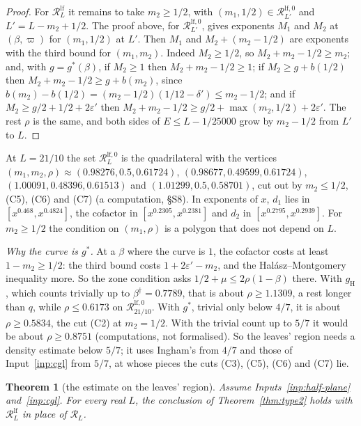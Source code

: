 \documentclass[11pt]{article}
\newtheorem{theorem}{Theorem}[section]
\theoremstyle{definition}
\begin{document}
\begin{proof}
For $\mathcal R^{\mathrm{lf}}_L$ it remains to take $m_2 \ge 1/2$, with $(m_1, 1/2) \in \mathcal
R^{\mathrm{lf},0}_{L'}$ and $L' = L - m_2 + 1/2$. The proof above, for $\mathcal R^{\mathrm{lf},0}_{L'}$, gives
exponents $M_1$ and $M_2$ at $(\beta, \varpi)$ for $(m_1, 1/2)$ at $L'$. Then $M_1$ and $M_2 + (m_2 - 1/2)$ are
exponents with the third bound for $(m_1, m_2)$. Indeed $M_2 \ge 1/2$, so $M_2 + m_2 - 1/2 \ge m_2$; and, with $g =
g^*(\beta)$, if $M_2 \ge 1$ then $M_2 + m_2 - 1/2 \ge 1$; if $M_2 \ge g + b(1/2)$ then $M_2 + m_2 - 1/2 \ge g +
b(m_2)$, since $b(m_2) - b(1/2) = (m_2 - 1/2)(1/12 - \delta') \le m_2 - 1/2$; and if $M_2 \ge g/2 + 1/2 +
2\varepsilon'$ then $M_2 + m_2 - 1/2 \ge g/2 + \max(m_2, 1/2) + 2\varepsilon'$. The rest $\rho$ is the same, and both
sides of $E \le L - 1/25000$ grow by $m_2 - 1/2$ from $L'$ to $L$.
\end{proof}

At $L = 21/10$ the set $\mathcal R^{\mathrm{lf},0}_L$ is the quadrilateral with the vertices $(m_1, m_2, \rho) \approx
(0.98276, 0.5, 0.61724)$, $(0.98677, 0.49599, 0.61724)$, $(1.00091, 0.48396, 0.61513)$ and $(1.01299, 0.5, 0.58701)$,
cut out by $m_2 \le 1/2$, (C5), (C6) and (C7) (a computation, \S S8). In exponents of $x$, $d_1$ lies in $[x^{0.468},
x^{0.4824}]$, the cofactor in $[x^{0.2305}, x^{0.2381}]$ and $d_2$ in $[x^{0.2795}, x^{0.2939}]$. For $m_2 \ge 1/2$ the
condition on $(m_1, \rho)$ is a polygon that does not depend on $L$.

\emph{Why the curve is $g^*$.} At a $\beta$ where the curve is $1$, the cofactor costs at least $1 - m_2 \ge 1/2$: the
third bound costs $1 + 2\varepsilon' - m_2$, and the Hal\'asz--Montgomery inequality more. So the zone condition asks
$1/2 + \mu \le 2\rho(1 - \beta)$ there. With $g_{\mathrm H}$, which counts trivially up to $\beta^\dagger = 0.7789$,
that is about $\rho \ge 1.1309$, a rest longer than $q$, while $\rho \le 0.6173$ on $\mathcal
R^{\mathrm{lf},0}_{21/10}$. With $g^*$, trivial only below $4/7$, it is about $\rho \ge 0.5834$, the cut (C2) at $m_2 =
1/2$. With the trivial count up to $5/7$ it would be about $\rho \ge 0.8751$ (computations, not formalised). So the
leaves' region needs a density estimate below $5/7$; it uses Ingham's from $4/7$ and those of
Input~\ref{inp:cgl} from $5/7$, at whose pieces the cuts (C3), (C5), (C6) and (C7) lie.

\begin{theorem}[the estimate on the leaves' region]\label{thm:type2-leaves}
Assume Inputs~\ref{inp:half-plane} and~\ref{inp:cgl}. For every real $L$, the conclusion of Theorem~\ref{thm:type2}
holds with $\mathcal R^{\mathrm{lf}}_L$ in place of $\mathcal R_L$.
\end{theorem}
\end{document}
